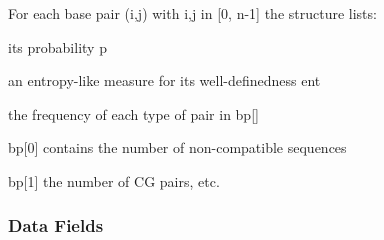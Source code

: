 For each base pair (i,j) with i,j in \mbox{[}0, n-\/1\mbox{]} the structure lists\+:
\begin{DoxyItemize}
\item its probability \textquotesingle{}p\textquotesingle{}
\item an entropy-\/like measure for its well-\/definedness \textquotesingle{}ent\textquotesingle{}
\item the frequency of each type of pair in \textquotesingle{}bp\mbox{[}\mbox{]}\textquotesingle{}
\begin{DoxyItemize}
\item \textquotesingle{}bp\mbox{[}0\mbox{]}\textquotesingle{} contains the number of non-\/compatible sequences
\item \textquotesingle{}bp\mbox{[}1\mbox{]}\textquotesingle{} the number of CG pairs, etc. 
\end{DoxyItemize}
\end{DoxyItemize}\subsubsection*{Data Fields}
